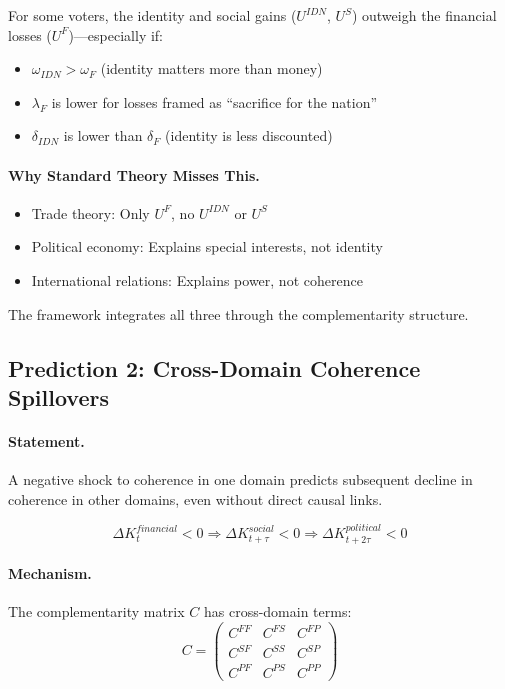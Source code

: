 \documentclass[12pt,a4paper]{article}
\begin{document}
For some voters, the identity and social gains ($U^{IDN}$, $U^S$)
outweigh the financial losses ($U^F$)---especially if:
\begin{itemize}
  \item $\omega_{IDN} > \omega_F$ (identity matters more than money)
  \item $\lambda_F$ is lower for losses framed as ``sacrifice for the nation''
  \item $\delta_{IDN}$ is lower than $\delta_F$ (identity is less discounted)
\end{itemize}

\paragraph{Why Standard Theory Misses This.}
\begin{itemize}
  \item Trade theory: Only $U^F$, no $U^{IDN}$ or $U^S$
  \item Political economy: Explains special interests, not identity
  \item International relations: Explains power, not coherence
\end{itemize}

The framework integrates all three through the complementarity structure.

\subsection{Prediction 2: Cross-Domain Coherence Spillovers}

\paragraph{Statement.}
A negative shock to coherence in one domain predicts subsequent
decline in coherence in other domains, even without direct causal links.

\begin{equation}
  \Delta K^{financial}_t < 0 \Rightarrow \Delta K^{social}_{t+\tau} < 0 
  \Rightarrow \Delta K^{political}_{t+2\tau} < 0
\end{equation}

\paragraph{Mechanism.}
The complementarity matrix $C$ has cross-domain terms:
\begin{equation}
  C = \begin{pmatrix}
    C^{FF} & C^{FS} & C^{FP} \\
    C^{SF} & C^{SS} & C^{SP} \\
    C^{PF} & C^{PS} & C^{PP}
  \end{pmatrix}
\end{equation}
\end{document}
